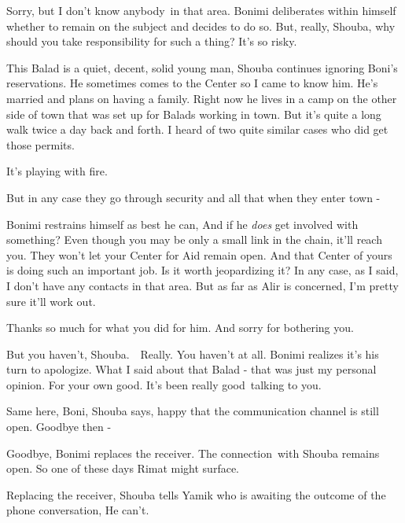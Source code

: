 \documentclass[letterpaper]{article}
\begin{document}
{\textquotedbl}Sorry, but I don't know anybody~in that area.{\textquotedbl} Bonimi deliberates within himself whether to
remain on the subject and decides to do so. {\textquotedbl}But, really, Shouba, why should you take responsibility for
such a thing? It's so risky.{\textquotedbl} 

{\textquotedbl}This Balad is a quiet, decent, solid young man,{\textquotedbl} Shouba continues ignoring Boni's
reservations. {\textquotedbl}He sometimes comes to the Center so I came to know him. He's married and plans on having a
family. Right now he lives in a camp on the other side of town that was set up for Balads working in town. But it's
quite a long walk twice a day back and forth. I heard of two quite similar cases who did get those
permits.{\textquotedbl}

{\textquotedbl}It's playing with fire.{\textquotedbl} 

{\textquotedbl}But in any case they go through security and all that when they enter town -{\textquotedbl}

Bonimi restrains himself as best he can, {\textquotedbl}And if he \textit{does} get involved with something? Even though
you may be only a small link in the chain, it'll reach you. They won't let your Center for Aid remain open. And that
Center of yours is doing such an important job. Is it worth jeopardizing it? In any case, as I said, I don't have any
contacts in that area. But as far as Alir is concerned, I'm pretty sure it'll work out.{\textquotedbl} 

{\textquotedbl}Thanks so much for what you did for him. And sorry for bothering you.{\textquotedbl} 

{\textquotedbl}But you haven't, Shouba.\ \ Really. You haven't at all.{\textquotedbl} Bonimi realizes it's his turn to
apologize. {\textquotedbl}What I said about that Balad - that was just my personal opinion. For your own good. It's
been really good\textcolor{red}{\ }talking to you.{\textquotedbl} 

{\textquotedbl}Same here, Boni,{\textquotedbl} Shouba says, happy that the communication channel is still open.
{\textquotedbl}Goodbye then -{\textquotedbl} 

{\textquotedbl}Goodbye,{\textquotedbl} Bonimi replaces the receiver. The connection~with Shouba remains open. So one of
these days Rimat might surface. 

Replacing the receiver, Shouba tells Yamik who is awaiting the outcome of the phone conversation, {\textquotedbl}He
can't.{\textquotedbl}
\end{document}
